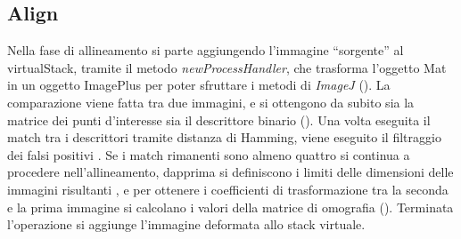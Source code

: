 \subsection{Align}
\noindent Nella fase di allineamento  si parte aggiungendo l'immagine ``sorgente'' al virtualStack, tramite il metodo \textit{newProcessHandler}, che trasforma l'oggetto Mat in un oggetto ImagePlus per poter sfruttare i metodi di \textit{ImageJ} (). La comparazione viene fatta tra due immagini, e si ottengono da subito sia la matrice dei punti d'interesse sia il descrittore binario (). Una volta eseguita il match tra i descrittori tramite distanza di Hamming, viene eseguito il filtraggio dei falsi positivi . Se i match rimanenti sono almeno quattro si continua a procedere nell'allineamento, dapprima si definiscono i limiti delle dimensioni delle immagini risultanti , e per ottenere i coefficienti di trasformazione tra la seconda e la prima immagine si calcolano i valori della matrice di omografia (). Terminata l'operazione si aggiunge l'immagine deformata allo stack virtuale.

